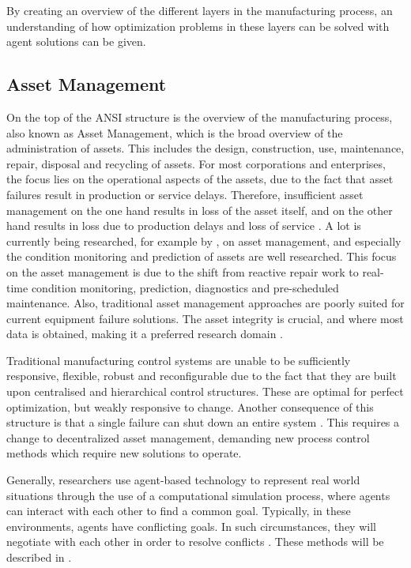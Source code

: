 By creating an overview of the different layers in the manufacturing process, an understanding of how optimization problems in these layers can be solved with agent solutions can be given.



\subsection{Asset Management}
On the top of the ANSI structure is the overview of the manufacturing process, also known as Asset Management, which is the broad overview of the administration of assets. This includes the design, construction, use, maintenance, repair, disposal and recycling of assets. For most corporations and enterprises, the focus lies on the operational aspects of the assets, due to the fact that asset failures result in production or service delays. Therefore, insufficient asset management on the one hand results in loss of the asset itself, and on the other hand results in loss due to production delays and loss of service \citep{trappey2013multi}.  A lot is currently being researched, for example by \citet{leitao2009agent}, on asset management, and  especially the condition monitoring and prediction of assets are well researched. This focus on the asset management is due to the shift from reactive repair work to real-time condition monitoring, prediction, diagnostics and pre-scheduled maintenance. Also, traditional asset management approaches are poorly suited for current equipment failure solutions. The asset integrity is crucial, and where most data is obtained, making it a preferred research domain \citep{lee153multi}. %
	
Traditional manufacturing control systems are unable to be sufficiently responsive, flexible, robust and reconfigurable due to the fact that they are built upon centralised and hierarchical control structures. These are optimal for perfect optimization, but weakly responsive to change. Another consequence of this structure is that a single failure can shut down an entire system \citep{leitao2009agent}. This requires a change to decentralized asset management, demanding new process control methods which require new solutions to operate. 
	
Generally, researchers use agent-based technology to represent real world situations through the use of a computational simulation process, where agents can interact with each other to find a common goal. Typically, in these environments, agents have conflicting goals. In such circumstances, they will negotiate with each other in order to resolve conflicts \citep{rosa2009intelligent}. These methods will be described in .
		
